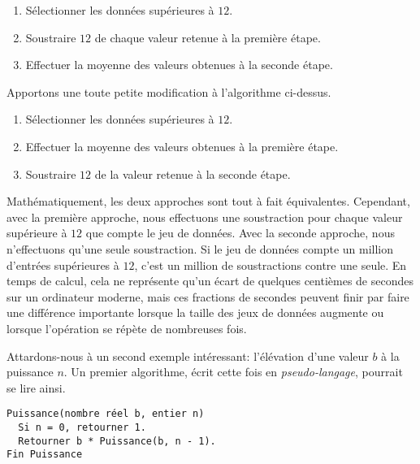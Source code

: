 \begin{Schunk}
  \begin{enumerate}
  \item Sélectionner les données supérieures à $12$.
  \item Soustraire $12$ de chaque valeur retenue à la première étape.
  \item Effectuer la moyenne des valeurs obtenues à la seconde étape.
  \end{enumerate}
\end{Schunk}

Apportons une toute petite modification à l'algorithme ci-dessus.

\begin{Schunk}
  \begin{enumerate}
  \item Sélectionner les données supérieures à $12$.
  \item Effectuer la moyenne des valeurs obtenues à la première étape.
  \item Soustraire $12$ de la valeur retenue à la seconde étape.
  \end{enumerate}
\end{Schunk}

Mathématiquement, les deux approches sont tout à fait équivalentes.
Cependant, avec la première approche, nous effectuons une soustraction
pour chaque valeur supérieure à $12$ que compte le jeu de données. Avec
la seconde approche, nous n'effectuons qu'une seule soustraction. Si
le jeu de données compte un million d'entrées supérieures à $12$,
c'est un million de soustractions contre une seule. En temps de
calcul, cela ne représente qu'un écart de quelques centièmes de
secondes sur un ordinateur moderne, mais ces fractions de secondes
peuvent finir par faire une différence importante lorsque la taille
des jeux de données augmente ou lorsque l'opération se répète de
nombreuses fois.

Attardons-nous à un second exemple intéressant: l'élévation d'une
valeur $b$ à la puissance $n$. Un premier algorithme, écrit cette fois
en \emph{pseudo-langage}, pourrait se lire
ainsi.

\begin{Schunk}
\begin{Verbatim}
Puissance(nombre réel b, entier n)
  Si n = 0, retourner 1.
  Retourner b * Puissance(b, n - 1).
Fin Puissance
\end{Verbatim}
\end{Schunk}

